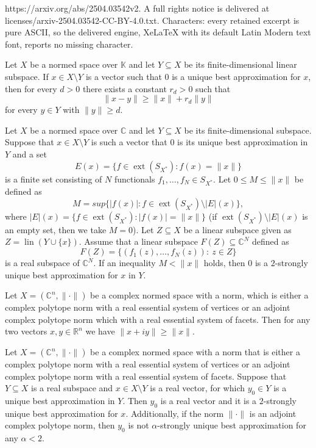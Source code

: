 \documentclass[10pt,a4paper]{amsart}
\DeclareMathOperator{\ext}{ext}
\DeclareMathOperator{\lin}{lin}
\begin{document}
https://arxiv.org/abs/2504.03542v2. A full rights notice is delivered at licenses/arxiv-2504.03542-CC-BY-4.0.txt. Characters: every retained excerpt is pure ASCII, so the delivered engine, XeLaTeX with its default Latin Modern text font, reports no missing character.
\begin{lem}
\label{lemcompact}
Let $X$ be a normed space over $\mathbb{K}$ and let $Y \subseteq X$ be its finite-dimensional linear subspace. If $x \in X \setminus Y$ is a vector such that $0$ is a unique best approximation for $x$, then for every $d>0$ there exists a constant $r_d>0$ such that
$$\|x-y\| \geq \|x\| + r_d\|y\|$$
for every $y \in Y$ with $\|y\| \geq d$.
\end{lem}

\begin{twr}
\label{twr2strgeneral}
Let $X$ be a normed space over $\mathbb{C}$ and let $Y \subseteq X$ be its finite-dimensional subspace. Suppose that $x \in X \setminus Y$ is such a vector that $0$ is its unique best approximation in $Y$ and a set
$$
E(x) = \{ f \in \ext(S_{X^*}): f(x) = \|x\| \}
$$
is a finite set consisting of $N$ functionals $f_1, \ldots, f_N \in S_{X^*}$. Let $0 \leq M \leq \|x\|$ be defined as
$$
M= sup\{|f(x)|: f \in \ext(S_{X^*} )\setminus |E|(x) \},
$$
where $ |E|(x) = \{ f \in \ext(S_{X^*}): |f(x)| = \|x\| \}$ (if $\ext(S_{X^*})\setminus |E|(x)$ is an empty set, then we take $M=0$). Let $Z \subseteq X$ be a linear subspace given as $Z=  \lin(Y \cup \{x\}).$ Assume that a linear subspace $F(Z) \subseteq \mathbb{C}^N$ defined as
$$ 
F(Z) = \{ (f_1(z), \ldots ,f_N(z)): \: z \in Z\}
$$
is a real subspace of $\mathbb{C}^N$. If an inequality $M < \|x\|$ holds, then $0$ is a $2$-strongly unique best approximation for $x$ in $Y$.
\end{twr}

\begin{lem}
\label{lemreal}
Let $X=(\mathbb{C}^n, \| \cdot \|)$ be a complex normed space with a norm, which is either a complex polytope norm with a real essential system of vertices or an adjoint complex polytope norm which with a real essential system of facets. Then for any two vectors $x, y \in \mathbb{R}^n$ we have $\|x+iy\| \geq \|x\|$. 
\end{lem}

\begin{twr}
\label{twrpolytope}
Let $X=(\mathbb{C}^n, \| \cdot \|)$ be a complex normed space with a norm that is either a complex polytope norm with a real essential system of vertices or an adjoint complex polytope norm with a real essential system of facets. Suppose that $Y \subseteq X$ is a real subspace and $x \in X \setminus Y$ is a real vector, for which $y_0 \in Y$ is a unique best approximation in $Y$. Then $y_0$ is a real vector and it is a $2$-strongly unique best approximation for $x$. Additionally, if the norm $\| \cdot \|$ is an adjoint complex polytope norm, then $y_0$ is not $\alpha$-strongly unique best approximation for any $\alpha<2$.
\end{twr}
\end{document}
